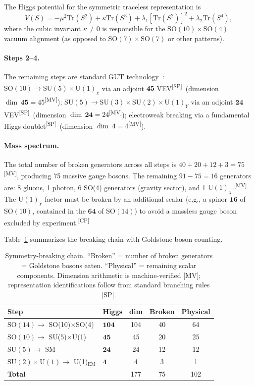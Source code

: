 \documentclass[aps,prd,twocolumn,showpacs,preprintnumbers,superscriptaddress,floatfix]{revtex4-2}
\newcommand{\Tr}{\mathrm{Tr}}
\newcommand{\MV}{\textsuperscript{[MV]}}
\newcommand{\CP}{\textsuperscript{[CP]}}
\newcommand{\SP}{\textsuperscript{[SP]}}
\begin{document}
The Higgs potential for the symmetric traceless representation is %
\begin{equation}\label{eq:potential}
  V(S) = -\mu^2 \Tr(S^2) + \kappa \Tr(S^3)
    + \lambda_1 [\Tr(S^2)]^2 + \lambda_2 \Tr(S^4),
\end{equation}
where the cubic invariant $\kappa \neq 0$ is responsible for the
$\mathrm{SO}(10) \times \mathrm{SO}(4)$ vacuum alignment (as opposed
to $\mathrm{SO}(7) \times \mathrm{SO}(7)$ or other patterns).

\paragraph{Steps 2--4.}
The remaining steps are standard GUT
technology~\cite{georgi1974,fritzsch1975}:
$\mathrm{SO}(10) \to \mathrm{SU}(5) \times \mathrm{U}(1)_\chi$
via an adjoint $\mathbf{45}$ VEV\SP\ (dimension $\dim\,\mathbf{45} = 45$\MV);
$\mathrm{SU}(5) \to \mathrm{SU}(3) \times \mathrm{SU}(2) \times \mathrm{U}(1)_Y$
via an adjoint $\mathbf{24}$ VEV\SP\ (dimension $\dim\,\mathbf{24} = 24$\MV);
electroweak breaking via a fundamental Higgs doublet\SP\ (dimension $\dim\,\mathbf{4} = 4$\MV).

\paragraph{Mass spectrum.}  The total number of broken generators across
all steps is $40 + 20 + 12 + 3 = 75$\MV, producing 75 massive gauge
bosons.  The remaining $91 - 75 = 16$ generators are: 8 gluons,
1 photon, 6 SO(4) generators (gravity sector), and 1
$\mathrm{U}(1)_\chi$.\MV{}  The $\mathrm{U}(1)_\chi$ factor
must be broken by an additional scalar (e.g., a spinor $\mathbf{16}$
of $\mathrm{SO}(10)$, contained in the $\mathbf{64}$ of
$\mathrm{SO}(14)$) to avoid a massless gauge boson excluded
by experiment.\CP

Table~\ref{tab:breaking} summarizes the breaking chain with
Goldstone boson counting.

\begin{table}[b]
\centering
\caption{Symmetry-breaking chain.  ``Broken'' = number of broken generators
  = Goldstone bosons eaten.  ``Physical'' = remaining scalar components.
  Dimension arithmetic is machine-verified [MV]; representation identifications follow from standard branching rules [SP].}
\label{tab:breaking}
\small
\begin{tabular}{@{}llccc@{}}
\toprule
\textbf{Step} & \textbf{Higgs} & \textbf{dim} & \textbf{Broken} & \textbf{Physical} \\
\midrule
$\mathrm{SO}(14) \to$ SO(10)$\times$SO(4) & $\mathbf{104}$ & 104 & 40 & 64 \\
$\mathrm{SO}(10) \to$ SU(5)$\times$U(1) & $\mathbf{45}$ & 45 & 20 & 25 \\
$\mathrm{SU}(5) \to$ SM & $\mathbf{24}$ & 24 & 12 & 12 \\
$\mathrm{SU}(2) \times \mathrm{U}(1) \to$ U(1)$_\text{EM}$ & $\mathbf{4}$ & 4 & 3 & 1 \\
\midrule
\textbf{Total} & & 177 & 75 & 102 \\
\bottomrule
\end{tabular}
\end{table}
\end{document}
